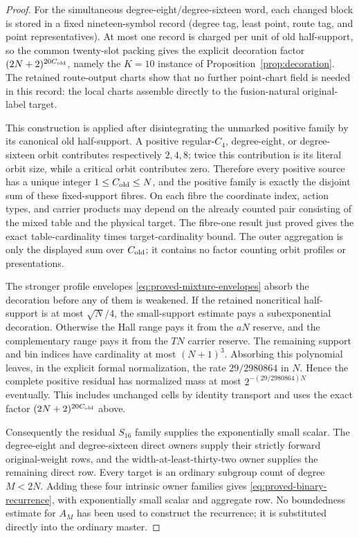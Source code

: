 \begin{proof}
For the simultaneous degree-eight/degree-sixteen word, each changed block is
stored in a fixed nineteen-symbol record (degree tag, least point, route tag,
and point representatives).  At most one record is charged per unit of old
half-support, so the common twenty-slot packing gives the explicit decoration
factor $(2N+2)^{20C_{\rm old}}$, namely the $K=10$ instance of
Proposition~\ref{prop:decoration}.  The retained route-output charts show that
no further point-chart field is needed in this record: the local charts
assemble directly to the fusion-natural original-label target.

This construction is applied after disintegrating the unmarked positive
family by its canonical old half-support.  A positive regular-$C_4$,
degree-eight, or degree-sixteen orbit contributes respectively $2,4,8$;
twice this contribution is its literal orbit size, while a critical orbit
contributes zero.  Therefore every positive source has a unique integer
$1\leq C_{\rm old}\leq N$, and the positive family is exactly the disjoint
sum of these fixed-support fibres.  On each fibre the coordinate index,
action types, and carrier products may depend on the already counted pair
consisting of the mixed table and the physical target.  The fibre-one result
just proved gives the exact table-cardinality times target-cardinality bound.
The outer aggregation is only the displayed sum over $C_{\rm old}$; it
contains no factor counting orbit profiles or presentations.

The stronger profile envelopes \eqref{eq:proved-mixture-envelopes} absorb the
decoration before any of them is weakened.  If the retained noncritical
half-support is at most $\sqrt N/4$, the small-support estimate pays a
subexponential decoration.  Otherwise the Hall range pays it from the
$aN$ reserve, and the complementary range pays it from the $TN$ carrier
reserve.  The remaining support and bin indices have cardinality at most
$(N+1)^3$.  Absorbing this polynomial leaves, in the explicit formal
normalization, the rate $29/2980864$ in $N$.  Hence the complete positive
residual has normalized mass at most
$2^{-(29/2980864)N}$ eventually.  This includes unchanged cells by identity
transport and uses the exact factor $(2N+2)^{20C_{\rm old}}$ above.

Consequently the residual $S_{16}$ family supplies the exponentially small
scalar.  The degree-eight and degree-sixteen direct owners supply their
strictly forward original-weight rows, and the width-at-least-thirty-two owner
supplies the remaining direct row.  Every target is an ordinary subgroup
count of degree $M<2N$.  Adding these four intrinsic owner families gives
\eqref{eq:proved-binary-recurrence}, with exponentially small scalar and
aggregate row.  No boundedness estimate for $A_M$ has been used to construct
the recurrence; it is substituted directly into the ordinary master.
\end{proof}
